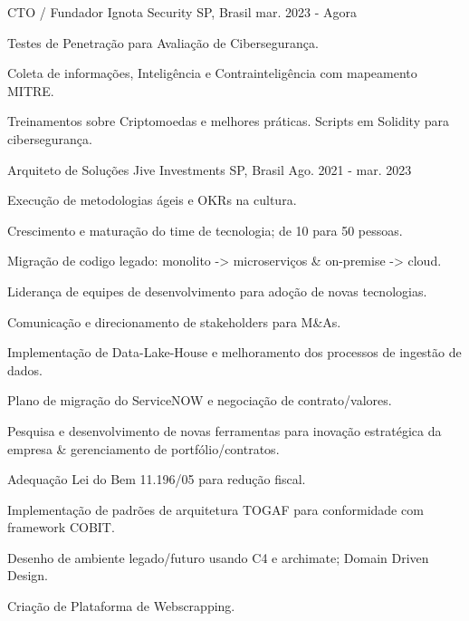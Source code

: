 

\begin{cventries}


    	\cventry
    {CTO / Fundador} %
    {Ignota Security} %
    {SP, Brasil} %
    {mar. 2023 - Agora} %
    {
    	\begin{cvitems} %
    		\item {Testes de Penetração para Avaliação de Cibersegurança.}
    		\item {Coleta de informações, Inteligência e Contrainteligência com mapeamento MITRE.}
    		\item {Treinamentos sobre Criptomoedas e melhores práticas. Scripts em Solidity para cibersegurança.}					
    	\end{cvitems}
    }   

   	\cventry
	{Arquiteto de Soluções} %
	{Jive Investments} %
	{SP, Brasil} %
	{Ago. 2021 - mar. 2023} %
	{
		\begin{cvitems} %
			\item {Execução de metodologias ágeis e OKRs na cultura.}
			\item {Crescimento e maturação do time de tecnologia; de 10 para 50 pessoas.}
			\item {Migração de codigo legado: monolito -> microserviços \& on-premise -> cloud.}
			\item {Liderança de equipes de desenvolvimento para adoção de novas tecnologias.}			
			\item {Comunicação e direcionamento de stakeholders para M\&As.}			
			\item {Implementação de Data-Lake-House e melhoramento dos processos de ingestão de dados.}
			\item {Plano de migração do ServiceNOW e negociação de contrato/valores.}
			\item {Pesquisa e desenvolvimento de novas ferramentas para inovação estratégica da empresa \& gerenciamento de portfólio/contratos. }
			\item {Adequação Lei do Bem 11.196/05 para redução fiscal.}			
			\item {Implementação de padrões de arquitetura TOGAF para conformidade com framework COBIT.}
			\item {Desenho de ambiente legado/futuro  usando C4 e archimate; Domain Driven Design.}
			\item {Criação de Plataforma de Webscrapping.}					
		\end{cvitems}
	}
 

\end{cventries}
